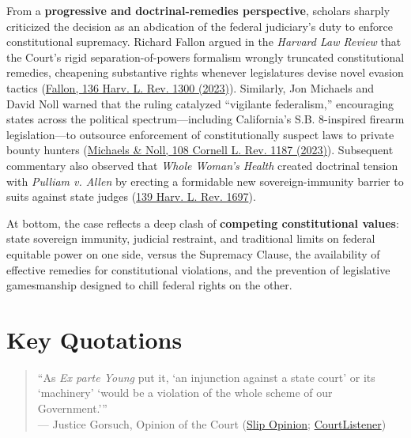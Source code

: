 \documentclass[12pt]{article}
\begin{document}
From a \textbf{progressive and doctrinal-remedies perspective}, scholars sharply criticized the decision as an abdication of the federal judiciary's duty to enforce constitutional supremacy. Richard Fallon argued in the \textit{Harvard Law Review} that the Court's rigid separation-of-powers formalism wrongly truncated constitutional remedies, cheapening substantive rights whenever legislatures devise novel evasion tactics (\href{https://harvardlawreview.org/print/vol-136/constitutional-remedies-in-one-era-and-out-the-other/}{Fallon, 136 Harv. L. Rev. 1300 (2023)}). Similarly, Jon Michaels and David Noll warned that the ruling catalyzed ``vigilante federalism,'' encouraging states across the political spectrum---including California's S.B. 8-inspired firearm legislation---to outsource enforcement of constitutionally suspect laws to private bounty hunters (\href{https://publications.lawschool.cornell.edu/lawreview/wp-content/uploads/sites/2/2023/09/Michaels-Noll-final.pdf}{Michaels \& Noll, 108 Cornell L. Rev. 1187 (2023)}). Subsequent commentary also observed that \textit{Whole Woman's Health} created doctrinal tension with \textit{Pulliam v. Allen} by erecting a formidable new sovereign-immunity barrier to suits against state judges (\href{https://harvardlawreview.org/wp-content/uploads/2026/05/139-Harv.-L.-Rev.-1697.pdf}{139 Harv. L. Rev. 1697}).

At bottom, the case reflects a deep clash of \textbf{competing constitutional values}: state sovereign immunity, judicial restraint, and traditional limits on federal equitable power on one side, versus the Supremacy Clause, the availability of effective remedies for constitutional violations, and the prevention of legislative gamesmanship designed to chill federal rights on the other.

\section{Key Quotations}

\begin{quote}
``As \textit{Ex parte Young} put it, `an injunction against a state court' or its `machinery' `would be a violation of the whole scheme of our Government.''' \\
--- Justice Gorsuch, Opinion of the Court (\href{https://www.supremecourt.gov/opinions/21pdf/21-463_3ebh.pdf}{Slip Opinion}; \href{https://www.courtlistener.com/opinion/5305640/whole-womans-health-v-jackson/}{CourtListener})
\end{quote}
\end{document}
